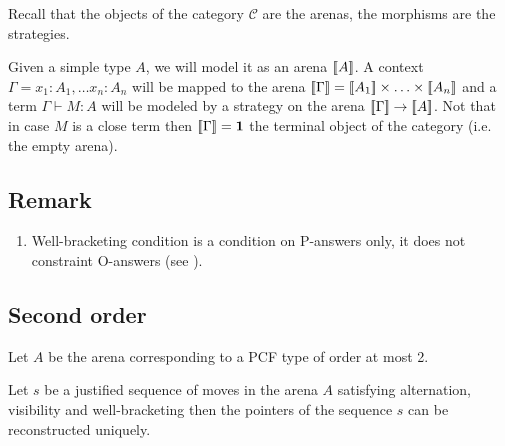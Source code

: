 Recall that the objects of the category $\mathcal{C}$ are the arenas, the morphisms are the strategies.

Given a simple type $A$, we will model it as an arena ${[\![ A ]\!]}$.
A context $\Gamma = x_1 :A_1, \ldots x_n:A_n$ will be mapped to the arena
${[\![ \Gamma ]\!]} = {[\![ A_1 ]\!]} \times \ldots \times {[\![A_n ]\!]}$ and a term $\Gamma \vdash M : A$
will be modeled by a strategy on the arena ${[\![ \Gamma ]\!]} \rightarrow {[\![A ]\!]}$.
Not that in case $M$ is a close term then ${[\![ \Gamma ]\!]} = \textbf{1}$ the terminal object of the category
(i.e. the empty arena).





\subsection{Remark}

\begin{enumerate}
\item
Well-bracketing condition is a condition on P-answers only, it does
not constraint O-answers (see \cite{abramsky:game-semantics}).

\end{enumerate}


\subsection{Second order}

\begin{lem}
Let $A$ be the arena corresponding to a PCF type of order at most 2.

Let $s$ be a justified sequence of moves in the arena $A$ satisfying
 alternation, visibility and well-bracketing then
the pointers of the sequence $s$ can be reconstructed uniquely.
\end{lem}



